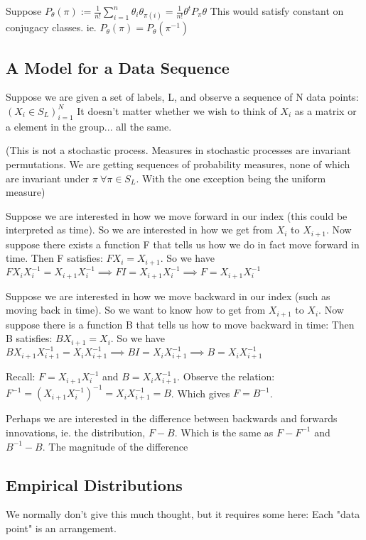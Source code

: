 \documentclass{article}
\theoremstyle{definition}
\begin{document}
Suppose \( P_\theta(\pi) := \frac{1}{n!}\sum_{i=1}^n \theta_i\theta_{\pi(i)} = \frac{1}{n!}\theta^t P_\pi\theta \) 
This would satisfy constant on conjugacy classes. ie. $ P_\theta(\pi) = P_\theta(\pi^{-1}) $

\subsection{A Model for a Data Sequence}
Suppose we are given a set of labels, L, and observe a sequence of N data points: $ (X_i \in S_L)_{i=1}^N$
It doesn't matter whether we wish to think of $X_i$ as a matrix or a element in the group... all the same.

(This is not a stochastic process. Measures in stochastic processes are invariant permutations. We are getting sequences of probability measures, none of which are invariant under $\pi \: \forall \pi \in S_L$. With the one exception being the uniform measure)

Suppose we are interested in how we move forward in our index (this could be interpreted as time). So we are interested in how we get from $X_i$ to $X_{i+1}$. Now suppose there exists a function F that tells us how we do in fact move forward in time.
Then F satisfies: $F X_i = X_{i+1} $. So we have $FX_i X_i^{-1} = X_{i+1}X_i^{-1} \implies FI = X_{i+1}X_i^{-1} \implies F = X_{i+1}X_i^{-1} $ 

Suppose we are interested in how we move backward in our index (such as moving back in time). So we want to know how to get from $X_{i+1}$ to $X_i$. Now suppose there is a function B that tells us how to move backward in time:
Then B satisfies: $BX_{i+1}= X_i$. So we have $BX_{i+1}X_{i+1}^{-1} = X_i X_{i+1}^{-1} \implies B I = X_i X_{i+1}^{-1} \implies  B = X_i X_{i+1}^{-1} $

Recall: $ F = X_{i+1}X_{i}^{-1}$ and $B = X_{i}X_{i+1}^{-1}$. Observe the relation: $F^{-1} = (X_{i+1}X_{i}^{-1})^{-1} = X_{i}X_{i+1}^{-1} = B$. Which gives $F = B^{-1}$.

Perhaps we are interested in the difference between backwards and forwards innovations, ie. the distribution, $F - B$. Which is the same as $F - F^{-1}$ and $B^{-1} - B$. The magnitude of the difference 


\subsection{Empirical Distributions}
We normally don't give this much thought, but it requires some here:
Each "data point" is an arrangement.
\end{document}
